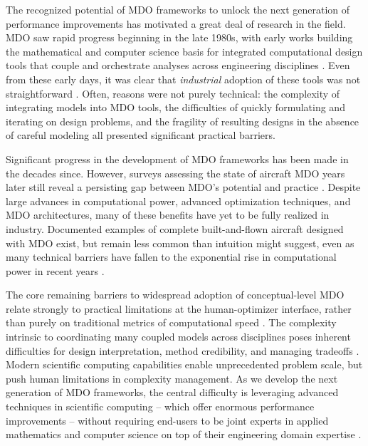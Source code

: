 The recognized potential of MDO frameworks to unlock the next generation of performance improvements has motivated a great deal of research in the field. MDO saw rapid progress beginning in the late 1980s, with early works building the mathematical and computer science basis for integrated computational design tools that couple and orchestrate analyses across engineering disciplines \cite{ashley_making_1982, vanderplaats_automated_1976, haftka_multidisciplinary_1997}. Even from these early days, it was clear that \emph{industrial} adoption of these tools was not straightforward \cite{kroo_multidisciplinary_1997, drela_pros_1998}. Often, reasons were not purely technical: the complexity of integrating models into MDO tools, the difficulties of quickly formulating and iterating on design problems, and the fragility of resulting designs in the absence of careful modeling all presented significant practical barriers.

Significant progress in the development of MDO frameworks has been made in the decades since. However, surveys assessing the state of aircraft MDO years later still reveal a persisting gap between MDO’s potential and practice \cite{agte_mdo_2010, drela_design_2011}. Despite large advances in computational power, advanced optimization techniques, and MDO architectures, many of these benefits have yet to be fully realized in industry. Documented examples of complete built-and-flown aircraft designed with MDO exist, but remain less common than intuition might suggest, even as many technical barriers have fallen to the exponential rise in computational power in recent years \cite{gazaix_industrialization_2017}.

The core remaining barriers to widespread adoption of conceptual-level MDO relate strongly to practical limitations at the human-optimizer interface, rather than purely on traditional metrics of computational speed \cite{gpkit}. The complexity intrinsic to coordinating many coupled models across disciplines poses inherent difficulties for design interpretation, method credibility, and managing tradeoffs \cite{salas_framework_1998}. Modern scientific computing capabilities enable unprecedented problem scale, but push human limitations in complexity management. As we develop the next generation of MDO frameworks, the central difficulty is leveraging advanced techniques in scientific computing -- which offer enormous performance improvements -- without requiring end-users to be joint experts in applied mathematics and computer science on top of their engineering domain expertise \cite{ma_modelingtoolkit_2021}.

